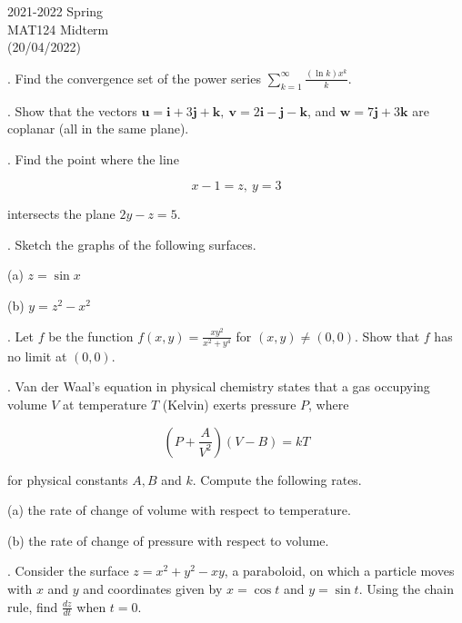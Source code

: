 \documentclass{article}
\begin{document}
\pagestyle{empty}
\large

\begin{center}
2021-2022 Spring \\MAT124 Midterm\\(20/04/2022)
\end{center}

. Find the convergence set of the power series $\displaystyle\sum_{k=1}^\infty\frac{(\ln k)x^k}k$.

\hfill

. Show that the vectors $\mathbf{u}=\mathbf{i}+3\mathbf{j}+\mathbf{k},\:\mathbf{v}=2\mathbf{i}-\mathbf{j}-\mathbf{k}$, and $\mathbf{w}=7\mathbf{j}+3\mathbf{k}$ are coplanar (all in the same plane).

\hfill

. Find the point where the line

\[x-1=z,\:y=3\]

\hfill

\noindent intersects the plane $2y-z=5$.

\hfill

. Sketch the graphs of the following surfaces.

\hfill

\noindent (a) $z=\sin x$

\hfill

\noindent (b) $y=z^2-x^2$

\hfill

. Let $f$ be the function $\displaystyle f(x,y)=\frac{xy^2}{x^2+y^4}$ for $(x,y)\neq(0,0)$. Show that $f$ has no limit at $(0,0)$.

\hfill

. Van der Waal's equation in physical chemistry states that a gas occupying volume $V$ at temperature $T$ (Kelvin) exerts pressure $P$, where

\[\left(P+\frac A{V^2}\right)(V-B)=kT\]

\hfill

\noindent for physical constants $A, B$ and $k$. Compute the following rates.

\hfill

\noindent (a) the rate of change of volume with respect to temperature.

\hfill

\noindent (b) the rate of change of pressure with respect to volume.

\hfill

. Consider the surface $z=x^2+y^2-xy$, a paraboloid, on which a particle moves with $x$ and $y$ and coordinates given by $x=\cos t$ and $y=\sin t$. Using the chain rule, find $\displaystyle\frac{dz}{dt}$ when $t=0$. 
\end{document}
